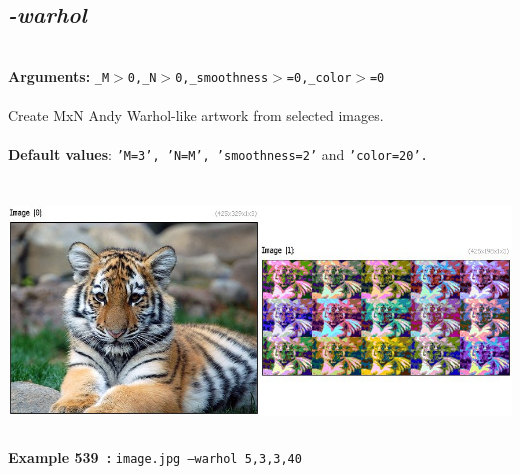 \documentclass[a4paper,11pt,twoside]{book}
\begin{document}
\subsection{\emph{-warhol} }\vspace*{-0.5em}
~\\\textbf{Arguments: } 
{\small \texttt{\_M$>$0,\_N$>$0,\_smoothness$>$=0,\_color$>$=0}}\\~\\
Create MxN Andy Warhol-like artwork from selected images.
~\\~\\\textbf{Default values}: {\small \texttt{'M=3', 'N=M', 'smoothness=2'} and \texttt{'color=20'.}}
\begin{center}\includegraphics[keepaspectratio=true,height=7cm,width=\textwidth]{img/gmic_def539.jpg}\\
{\footnotesize \textbf{Example 539~:} \texttt{image.jpg --warhol 5,3,3,40}}
\end{center}
\end{document}
